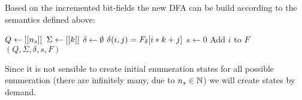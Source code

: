 \noindent Based on the incremented bit-fields the new DFA can be build according to the semantics defined above:
\vspace{0.2cm}
\begin{algorithmic}[1]
	\State $Q \gets [[{n_s}]]$
	\State $\Sigma \gets [[k]]$
	\State $\delta \gets \emptyset$
            \State $\delta(i, j) = F_\delta[i * k + j]$
		\EndFor
	\EndFor
	\State $s \gets 0$
			\State Add $i$ to $F$
		\EndIf
	\EndFor
	\State \Return $(Q, \Sigma, \delta, s, F)$
	\EndFunction
\end{algorithmic}
\vspace{0.2cm}


\noindent Since it is not sensible to create initial enumeration states for all possible enumeration (there are infinitely many, due to ${n_s}\in\mathbb{N}$) we will create states by demand.

